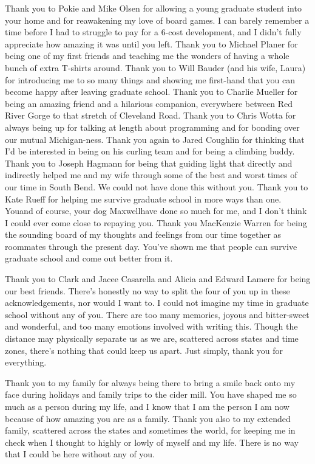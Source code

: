 \begin{acknowledge}
Thank you to Pokie and Mike Olsen for allowing a young graduate student
into your home and for reawakening my love of board games. I can barely
remember a time before I had to struggle to pay for a 6-cost
development, and I didn't fully appreciate how amazing it was until you
left. Thank you to Michael Planer for being one of my first friends and
teaching me the wonders of having a whole bunch of extra T-shirts
around. Thank you to Will Bauder (and his wife, Laura) for introducing
me to so many things and showing me first-hand that you can become happy
after leaving graduate school. Thank you to Charlie Mueller for being an
amazing friend and a hilarious companion, everywhere between Red River
Gorge to that stretch of Cleveland Road. Thank you to Chris Wotta for
always being up for talking at length about programming and for bonding
over our mutual Michigan-ness. Thank you again to Jared Coughlin for
thinking that I'd be interested in being on his curling team and for
being a climbing buddy. Thank you to Joseph Hagmann for being that
guiding light that directly and indirectly helped me and my wife through
some of the best and worst times of our time in South Bend. We could not
have done this without you. Thank you to Kate Rueff for helping me
survive graduate school in more ways than one. You\textemdash{}and of
course, your dog Maxwell\textemdash{}have done so much for me, and I
don't think I could ever come close to repaying you. Thank you MacKenzie
Warren for being the sounding board of my thoughts and feelings from our
time together as roommates through the present day. You've shown me that
people can survive graduate school and come out better from it.

Thank you to Clark and Jacee Casarella and Alicia and Edward Lamere for
being our best friends. There's honestly no way to split the four of you
up in these acknowledgements, nor would I want to. I could not imagine
my time in graduate school without any of you. There are too many
memories, joyous and bitter-sweet and wonderful, and too many emotions
involved with writing this. Though the distance may physically separate
us as we are, scattered across states and time zones, there's nothing
that could keep us apart. Just simply, thank you for everything.

Thank you to my family for always being there to bring a smile back onto
my face during holidays and family trips to the cider mill. You have
shaped me so much as a person during my life, and I know that I am the
person I am now because of how amazing you are as a family. Thank you
also to my extended family, scattered across the states and sometimes
the world, for keeping me in check when I thought to highly or lowly of
myself and my life. There is no way that I could be here without any of
you.


\end{acknowledge}
